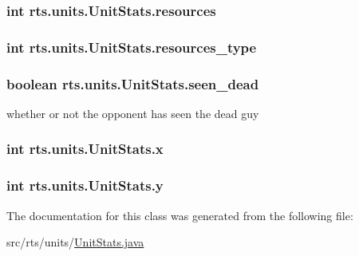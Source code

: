 \label{classrts_1_1units_1_1_unit_stats_a9f6197b668783aae1b851f6a5910802f}
\hypertarget{classrts_1_1units_1_1_unit_stats_a0798670a97016a31c749dbb431e0545f}{
\subsubsection[{resources}]{\setlength{\rightskip}{0pt plus 5cm}int {\bf rts.units.UnitStats.resources}}}
\label{classrts_1_1units_1_1_unit_stats_a0798670a97016a31c749dbb431e0545f}
\hypertarget{classrts_1_1units_1_1_unit_stats_a0c1250ffeeefa0481e39ca5b77c343a1}{
\subsubsection[{resources\_\-type}]{\setlength{\rightskip}{0pt plus 5cm}int {\bf rts.units.UnitStats.resources\_\-type}}}
\label{classrts_1_1units_1_1_unit_stats_a0c1250ffeeefa0481e39ca5b77c343a1}
\hypertarget{classrts_1_1units_1_1_unit_stats_aa40770ab0f85befe15759688bde51263}{
\subsubsection[{seen\_\-dead}]{\setlength{\rightskip}{0pt plus 5cm}boolean {\bf rts.units.UnitStats.seen\_\-dead}}}
\label{classrts_1_1units_1_1_unit_stats_aa40770ab0f85befe15759688bde51263}
whether or not the opponent has seen the dead guy \hypertarget{classrts_1_1units_1_1_unit_stats_ab5601c1762edb9db5d6f4844359ec881}{
\subsubsection[{x}]{\setlength{\rightskip}{0pt plus 5cm}int {\bf rts.units.UnitStats.x}}}
\label{classrts_1_1units_1_1_unit_stats_ab5601c1762edb9db5d6f4844359ec881}
\hypertarget{classrts_1_1units_1_1_unit_stats_a6942c21b6de9bbe54c2fd40d46934ee4}{
\subsubsection[{y}]{\setlength{\rightskip}{0pt plus 5cm}int {\bf rts.units.UnitStats.y}}}
\label{classrts_1_1units_1_1_unit_stats_a6942c21b6de9bbe54c2fd40d46934ee4}


The documentation for this class was generated from the following file:\begin{DoxyCompactItemize}
\item 
src/rts/units/\hyperlink{_unit_stats_8java}{UnitStats.java}\end{DoxyCompactItemize}

